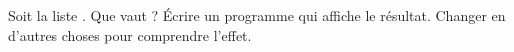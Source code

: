 
\begin{exercice}\label{exoPremiere-0070}

    Soit la liste . Que vaut  ? Écrire un programme qui affiche le résultat. Changer \info{*} en d'autres choses pour comprendre l'effet.

\end{exercice}
